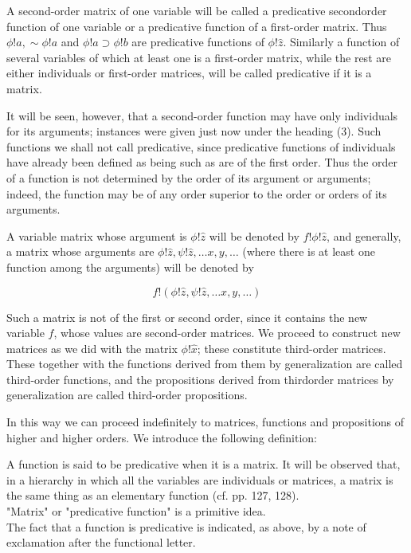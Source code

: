 \documentclass[10pt]{article}
\begin{document}
A second-order matrix of one variable will be called a predicative secondorder function of one variable or a predicative function of a first-order matrix. Thus $\phi!a, \sim \phi!a$ and $\phi!a \supset \phi!b$ are predicative functions of $\phi!\hat{z}$. Similarly a function of several variables of which at least one is a first-order matrix, while the rest are either individuals or first-order matrices, will be called predicative if it is a matrix.

It will be seen, however, that a second-order function may have only individuals for its arguments; instances were given just now under the heading (3). Such functions we shall not call predicative, since predicative functions of individuals have already been defined as being such as are of the first order. Thus the order of a function is not determined by the order of its argument or arguments; indeed, the function may be of any order superior to the order or orders of its arguments.

A variable matrix whose argument is $\phi!\hat{z}$ will be denoted by $f!\phi!\hat{z}$, and generally, a matrix whose arguments are $\phi!\hat{z}, \psi!\hat{z}, \ldots x, y, \ldots$ (where there is at least one function among the arguments) will be denoted by

$$
f!(\phi!\hat{z}, \psi!\hat{z}, \ldots x, y, \ldots)
$$

Such a matrix is not of the first or second order, since it contains the new variable $f$, whose values are second-order matrices. We proceed to construct new matrices as we did with the matrix $\phi!\hat{x}$; these constitute third-order matrices. These together with the functions derived from them by generalization are called third-order functions, and the propositions derived from thirdorder matrices by generalization are called third-order propositions.

In this way we can proceed indefinitely to matrices, functions and propositions of higher and higher orders. We introduce the following definition:

A function is said to be predicative when it is a matrix. It will be observed that, in a hierarchy in which all the variables are individuals or matrices, a matrix is the same thing as an elementary function (cf. pp. 127, 128).\\
"Matrix" or "predicative function" is a primitive idea.\\
The fact that a function is predicative is indicated, as above, by a note of exclamation after the functional letter.
\end{document}
